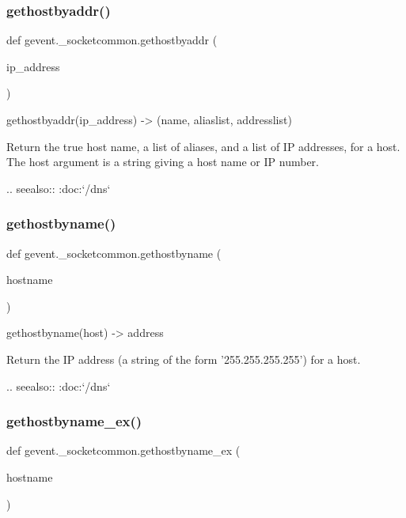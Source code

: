 \subsubsection{\texorpdfstring{gethostbyaddr()}{gethostbyaddr()}}
{\footnotesize\ttfamily def gevent.\+\_\+socketcommon.\+gethostbyaddr (\begin{DoxyParamCaption}\item[{}]{ip\+\_\+address }\end{DoxyParamCaption})}

\begin{DoxyVerb}gethostbyaddr(ip_address) -> (name, aliaslist, addresslist)

Return the true host name, a list of aliases, and a list of IP addresses,
for a host.  The host argument is a string giving a host name or IP number.

.. seealso:: :doc:`/dns`
\end{DoxyVerb}
 \mbox{\label{namespacegevent_1_1__socketcommon_a2ee0bbc0ffce8551ebdb2359e4c34f32}} 
\subsubsection{\texorpdfstring{gethostbyname()}{gethostbyname()}}
{\footnotesize\ttfamily def gevent.\+\_\+socketcommon.\+gethostbyname (\begin{DoxyParamCaption}\item[{}]{hostname }\end{DoxyParamCaption})}

\begin{DoxyVerb}gethostbyname(host) -> address

Return the IP address (a string of the form '255.255.255.255') for a host.

.. seealso:: :doc:`/dns`
\end{DoxyVerb}
 \mbox{\label{namespacegevent_1_1__socketcommon_a9200bf7e6fcf07e5a4303eb2d92b3c95}} 
\subsubsection{\texorpdfstring{gethostbyname\+\_\+ex()}{gethostbyname\_ex()}}
{\footnotesize\ttfamily def gevent.\+\_\+socketcommon.\+gethostbyname\+\_\+ex (\begin{DoxyParamCaption}\item[{}]{hostname }\end{DoxyParamCaption})}

